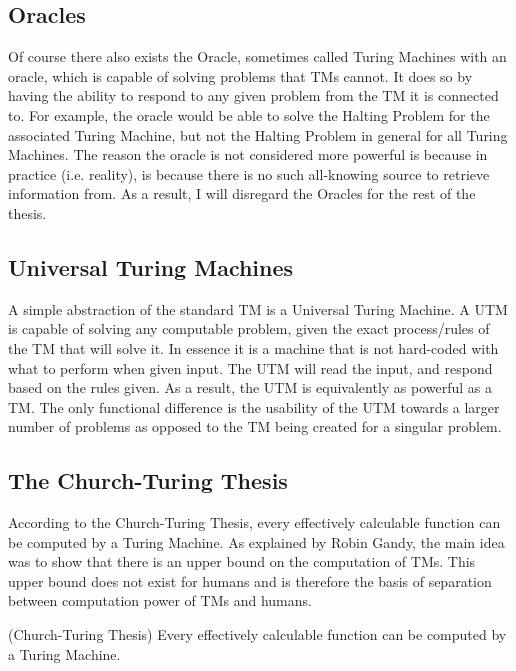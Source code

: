 \subsection{Oracles}\label{subsec:Oracles}

Of course there also exists the Oracle, sometimes called Turing Machines with an oracle, which is capable of solving problems that TMs cannot.
It does so by having the ability to respond to any given problem from the TM it is connected to.
For example, the oracle would be able to solve the Halting Problem for the associated Turing Machine, but not the Halting Problem in general for all Turing Machines.
The reason the oracle is not considered more powerful is because in practice (i.e. reality), is because there is no such all-knowing source to retrieve information from.
As a result, I will disregard the Oracles for the rest of the thesis.

\subsection{Universal Turing Machines}\label{subsec:UTM}

A simple abstraction of the standard TM is a Universal Turing Machine. A UTM is capable of solving any computable problem, given the exact process/rules of the TM that will solve it.
In essence it is a machine that is not hard-coded with what to perform when given input.
The UTM will read the input, and respond based on the rules given.
As a result, the UTM is equivalently as powerful as a TM.
The only functional difference is the usability of the UTM towards a larger number of problems as opposed to the TM being created for a singular problem.

\subsection{The Church-Turing Thesis}\label{subsec:Church-Turing Thesis}

According to the Church-Turing Thesis, every effectively calculable function can be computed by a Turing Machine.
As explained by Robin Gandy, the main idea was to show that there is an upper bound on the computation of TMs.
This upper bound does not exist for humans and is therefore the basis of separation between computation power of TMs and humans.

\begin{thm}
    \label{thm:CTT}
    (Church-Turing Thesis) Every effectively calculable function can be computed by a Turing Machine.
\end{thm}


